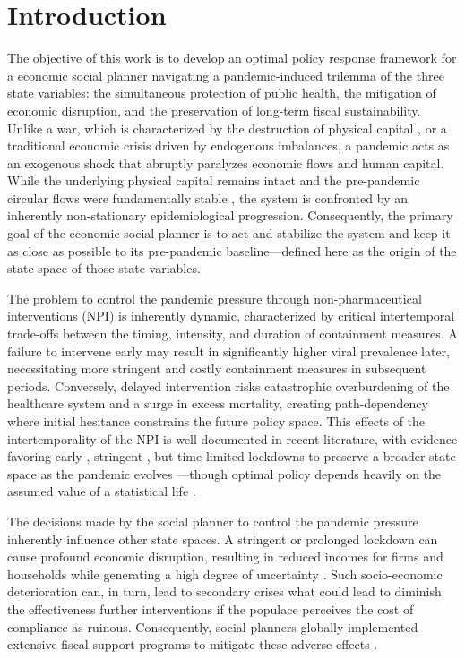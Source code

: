 \documentclass[12pt, a4paper]{article}
\begin{document}
\newpage

\section{Introduction}

The objective of this work is to develop an optimal policy response framework for a economic social planner navigating a pandemic-induced trilemma of the three state variables: the simultaneous protection of public health, the mitigation of economic disruption, and the preservation of long-term fiscal sustainability. Unlike a war, which is characterized by the destruction of physical capital \citep{jorda2022longer}, or a traditional economic crisis driven by endogenous imbalances, a pandemic acts as an exogenous shock that abruptly paralyzes economic flows and human capital. While the underlying physical capital remains intact and the pre-pandemic circular flows were fundamentally stable \citep{imf2019weo}, the system is confronted by an inherently non-stationary epidemiological progression. Consequently, the primary goal of the economic social planner is to act and stabilize the system and keep it as close as possible to its pre-pandemic baseline—defined here as the origin of the state space of those state variables.

The problem to control the pandemic pressure through non-pharmaceutical interventions (NPI) is inherently dynamic, characterized by critical intertemporal trade-offs between the timing, intensity, and duration of containment measures. A failure to intervene early may result in significantly higher viral prevalence later, necessitating more stringent and costly containment measures in subsequent periods. Conversely, delayed intervention risks catastrophic overburdening of the healthcare system and a surge in excess mortality, creating path-dependency where initial hesitance constrains the future policy space. This effects of the intertemporality of the NPI is well documented in recent literature, with evidence favoring early \citep{acemoglu2021}, stringent \citep{balmford2020}, but time-limited \citep{alvarez2020} lockdowns to preserve a broader state space as the pandemic evolves \citep{kargi2023, loayza2020}---though optimal policy depends heavily on the assumed value of a statistical life \citep{alvarez2021}.

The decisions made by the social planner to control the pandemic pressure inherently influence other state spaces. A stringent or prolonged lockdown can cause profound economic disruption, resulting in reduced incomes for firms and households while generating a high degree of uncertainty \citep{guerrieri2022, eichenbaum2021macro, portes2020economic}. Such socio-economic deterioration can, in turn, lead to secondary crises what could lead to diminish the effectiveness further interventions if the populace perceives the cost of compliance as ruinous. %
Consequently, social planners globally implemented extensive fiscal support programs to mitigate these adverse effects \citep{erokhin2020}. 
\end{document}
